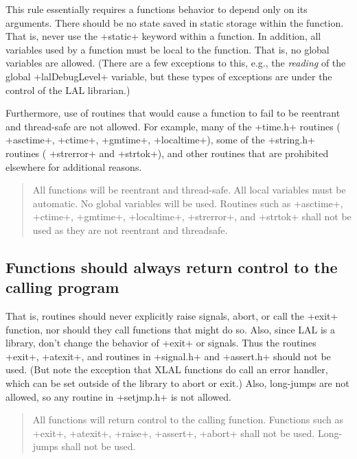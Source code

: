 \documentclass[10pt]{ligodcc}
\makeatletter
\def\verb{\relax\ifmmode\hbox\else\leavevmode\null\fi
  \bgroup
    \color{blue}\small
    \verb@eol@error \let\do\@makeother \dospecials
    \verbatim@font\@noligs
    \@ifstar\@sverb\@verb}
\newlength{\fminilength}
\newenvironment{fminipage}[1][\linewidth]
  {\setlength{\fminilength}{#1-2\fboxsep-2\fboxrule}%
   \begin{lrbox}{\fminibox}\begin{minipage}{\fminilength}}
  {\end{minipage}\end{lrbox}\noindent\fbox{\usebox{\fminibox}}}
\newenvironment{lalrule}{\begin{quote}\color{red}\begin{fminipage}}
  {\end{fminipage}\end{quote}}
\makeatother
\begin{document}
This rule essentially requires a functions behavior to depend only on its
arguments.  There should be no state saved in static storage within the
function.  That is, never use the \verb+static+ keyword within a function.
In addition, all variables used by a function must be local to the function.
That is, no global variables are allowed.  (There are a few exceptions to this,
e.g., the \emph{reading} of the global \verb+lalDebugLevel+ variable, but these
types of exceptions are under the control of the LAL librarian.)

Furthermore, use of routines that would cause a function to fail to be
reentrant and thread-safe are not allowed.  For example, many of the
\verb+time.h+ routines (\verb+asctime+, \verb+ctime+, \verb+gmtime+,
\verb+localtime+), some of the \verb+string.h+ routines (\verb+strerror+ and
\verb+strtok+), and other routines that are prohibited elsewhere for
additional reasons.
\begin{lalrule}
All functions will be reentrant and thread-safe.  All local variables
must be automatic.  No global variables will be used.  Routines such as
\verb+asctime+, \verb+ctime+, \verb+gmtime+, \verb+localtime+,
\verb+strerror+, and \verb+strtok+ shall not be used as they are not
reentrant and threadsafe.
\end{lalrule}


\subsection{Functions should always return control to the calling program}

That is, routines should never explicitly raise signals, abort, or call the
\verb+exit+ function, nor should they call functions that might do so.  Also,
since LAL is a library, don't change the behavior of \verb+exit+ or signals.
Thus the routines \verb+exit+, \verb+atexit+, and routines in \verb+signal.h+
and \verb+assert.h+ should not be used.  (But note the exception that XLAL
functions do call an error handler, which can be set outside of the library to
abort or exit.)  Also, long-jumps are not allowed, so any routine in
\verb+setjmp.h+ is not allowed. 
\begin{lalrule}
All functions will return control to the calling function.  Functions such
as \verb+exit+, \verb+atexit+, \verb+raise+, \verb+assert+, \verb+abort+
shall not be used.  Long-jumps shall not be used.
\end{lalrule}
\end{document}
